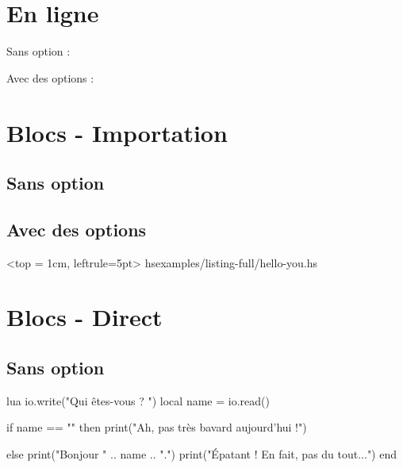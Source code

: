\documentclass[theme = dark]{../main/main}
\begin{document}
\section{En ligne}

Sans option :




Avec des options :





\section{Blocs - Importation}

\subsection{Sans option}





\subsection{Avec des options}

\tdoccodeinput[style=solarized-light, linenos]%
              <top = 1cm, leftrule=5pt>%
              {hs}{examples/listing-full/hello-you.hs}



\section{Blocs - Direct}

\subsection{Sans option}

\begin{tdoccode}{lua}
io.write("Qui êtes-vous ? ")
local name = io.read()

if name == "" then
    print("Ah, pas très bavard aujourd'hui !")

else
    print("Bonjour " .. name .. ".")
    print("Épatant ! En fait, pas du tout...")
end
\end{tdoccode}
\end{document}
